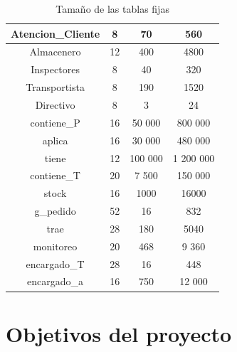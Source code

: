 \documentclass[10pt, a4paper,openany]{report}
\begin{document}
\begin{table}[h]
\begin{center}
\begin{tabular}[c]{|c|c|c|c|}
			\hline
			Atencion\_Cliente                              & 8   & 70        & 560         \\
			\hline
			Almacenero                                     & 12  & 400       & 4800        \\
			\hline
			Inspectores                                    & 8   & 40        & 320         \\
			\hline
			Transportista                                  & 8   & 190       & 1520        \\
			\hline
			Directivo                                      & 8   & 3         & 24          \\
			\hline
			contiene\_P                                    & 16  & 50 000    & 800 000     \\
			\hline
			aplica                                         & 16  & 30 000    & 480 000     \\
			\hline
			tiene                                          & 12  & 100 000   & 1 200 000   \\
			\hline
			contiene\_T                                    & 20  & 7 500     & 150 000     \\
			\hline
			stock                                          & 16  & 1000      & 16000       \\
			\hline
			g\_pedido                                      & 52  & 16        & 832         \\
			\hline
			trae                                           & 28  & 180       & 5040        \\
			\hline
			monitoreo                                      & 20  & 468       & 9 360       \\
			\hline
			encargado\_T                                   & 28  & 16        & 448         \\
			\hline
			encargado\_a                                   & 16  & 750       & 12 000      \\

			\hline
		\end{tabular}
	\end{center}
	\caption{Tamaño de las tablas fijas}
\end{table}
\pagebreak



\section{Objetivos del proyecto}
\label{sec:Objetivos del proyecto}
\end{document}
